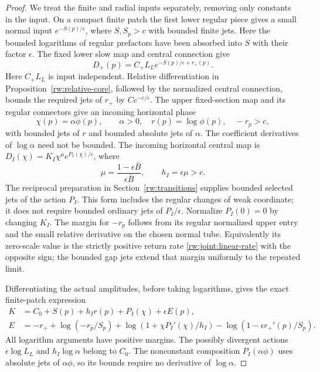 \begin{proof}
We treat the finite and radial inputs separately, removing only constants
in the input. On a compact finite patch the first lower regular piece
gives a small normal input
$e^{-S(p)/\epsilon}$, where $S,S_p>c$ with bounded finite jets.
Here the bounded logarithms of regular prefactors have been absorbed
into $S$ with their factor $\epsilon$.
The fixed lower slow map and central connection give
\[
 D_+(p)=C_+L_L e^{-S(p)/\epsilon+r_+(p)}.
\]
Here $C_+L_L$ is input independent. Relative differentiation in
Proposition~\ref{rw:relative-core}, followed by the normalized central
connection, bounds the required jets of $r_+$ by $Ce^{-c/\epsilon}$.
The upper fixed-section map and its regular connectors give an
incoming horizontal phase
\[
 \chi(p)=\alpha\phi(p),\qquad
 \alpha>0,\quad r(p)=\log\phi(p),\quad-r_p>c,
\]
with bounded jets of $r$ and bounded absolute jets of $\alpha$.
The coefficient derivatives of $\log\alpha$ need not be bounded.
The incoming horizontal central map is
$D_I(\chi)=K_I\chi^\mu e^{P_I(\chi)/\epsilon}$, where
\[
 \mu=\frac{1-\epsilon\bar B}{\epsilon\bar B},
 \qquad h_I=\epsilon\mu>c.
\]
The reciprocal preparation in Section~\ref{rw:transitions} supplies
bounded selected jets of the action $P_I$. This form includes the
regular changes of weak coordinate; it does not require bounded
ordinary jets of $P_I/\epsilon$. Normalize $P_I(0)=0$ by changing
$K_I$.
The margin for $-r_p$ follows from its regular normalized upper
entry and the small relative derivative on the chosen normal tube.
Equivalently its zero-scale value is the strictly positive return
rate \eqref{rw:joint:linear-rate} with the opposite sign; the bounded
gap jets extend that margin uniformly to the repeated limit.

Differentiating the actual amplitudes, before taking logarithms,
gives the exact finite-patch expression
\begin{equation}\label{rw:joint:finite-log}
\begin{split}
 K&=C_0+S(p)+h_I r(p)+P_I(\chi)+\epsilon E(p),\\
 E&=-r_+
       +\log(-r_p/S_p)
       +\log(1+\chi P_I'(\chi)/h_I)
       -\log(1-\epsilon r_+'(p)/S_p).
\end{split}
\end{equation}
All logarithm arguments have positive margins. The possibly divergent
actions $\epsilon\log L_L$ and $h_I\log\alpha$ belong to $C_0$.
The nonconstant composition $P_I(\alpha\phi)$ uses absolute jets of
$\alpha\phi$, so its bounds require no derivative of $\log\alpha$.


\end{proof}
